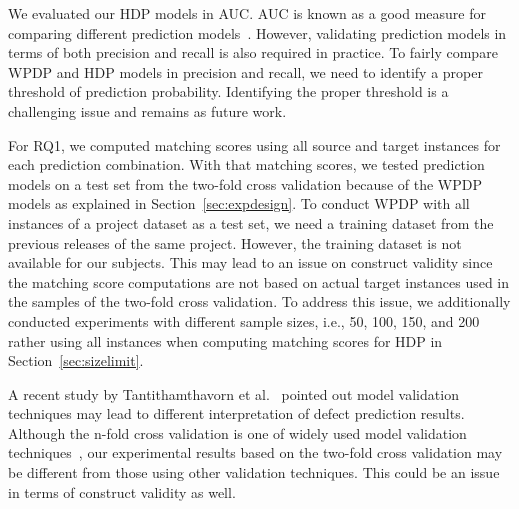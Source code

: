 We evaluated our HDP models in AUC.
	AUC is known as a good measure for comparing different prediction
	models~\cite{Giger12,Lessmann08,Rahman12,Song11}. However, validating
	prediction models in terms of both precision and recall is also required in
	practice. To fairly compare WPDP and HDP models in precision
	and recall, we need to identify a proper threshold of prediction probability.
	Identifying the proper threshold is a challenging issue and remains as
	future work.

For RQ1, we computed matching scores using all
	source and target instances for each prediction combination.
	With that matching scores, we tested prediction models on a test set from the two-fold cross validation because of the WPDP models as explained in Section~\ref{sec:expdesign}.
	To conduct WPDP with all instances of a project dataset as a test set, we need a training dataset from the previous releases of the same project. However, the training dataset is not
	available for our subjects. This may lead to an issue on construct validity since the matching score computations are not based on actual target instances used in the samples of the two-fold cross validation. To address this issue, we additionally conducted experiments with different sample sizes, i.e., 50, 100, 150, and 200 rather using all instances when computing matching scores for HDP in Section~\ref{sec:sizelimit}.

A recent study by Tantithamthavorn et al.~\cite{Tantithamthavorn16} pointed out model validation techniques may lead to different interpretation of defect prediction results. Although the n-fold cross validation is one of widely used model validation techniques~\cite{Klas2010,Nam13,Pinzger2008}, our experimental results based on the two-fold cross validation may be different from those using other validation techniques. This could be an issue in terms of construct validity as well.
	

